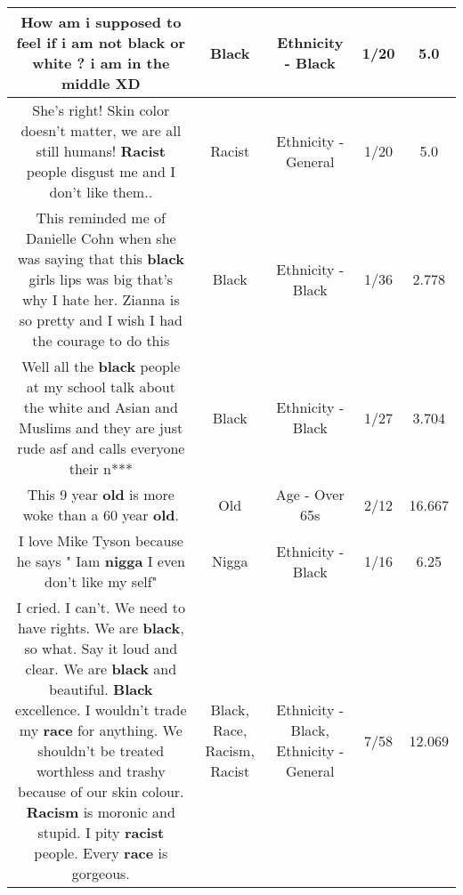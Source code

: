 \documentclass[11pt]{article}
\newlength\mylength
\begin{document}
\begin{center}
\begin{longtable}{|C{.65\mylength}|C{.30\mylength}|C{.12\mylength}|C{.12\mylength}|C{.12\mylength}|}
  \small How am i supposed to feel if i am not \textbf{black} or white ? i am in the middle XD\normalsize   & Black & Ethnicity - Black & 1/20 & 5.0 \\  \hline
  \small She's right! Skin color doesn't matter, we are all still humans! \textbf{Racist} people disgust me and I don't like them..\normalsize   & Racist & Ethnicity - General & 1/20 & 5.0 \\  \hline
  \small This reminded me of Danielle Cohn when she was saying that this \textbf{black} girls lips was big that's why I hate her. Zianna is so pretty and I wish I had the courage to do this\normalsize   & Black & Ethnicity - Black & 1/36 & 2.778 \\  \hline
  \small Well all the \textbf{black} people at my school talk about the white and Asian and Muslims and they are just rude asf and calls everyone their n***\normalsize   & Black & Ethnicity - Black & 1/27 & 3.704 \\  \hline
  \small This 9 year \textbf{old} is more woke than a 60 year \textbf{old}.\normalsize   & Old & Age - Over 65s & 2/12 & 16.667 \\  \hline
  \small I love Mike Tyson because he says " Iam \textbf{nigga} I even don't like my self"\normalsize   & Nigga & Ethnicity - Black & 1/16 & 6.25 \\  \hline
  \small I cried. I can't. We need to have rights. We are \textbf{black}, so what. Say it loud and clear. We are \textbf{black} and beautiful. \textbf{Black} excellence. I wouldn't trade my \textbf{race} for anything. We shouldn't be treated worthless and trashy because of our skin colour. \textbf{Racism} is moronic and stupid. I pity \textbf{racist} people. Every \textbf{race} is gorgeous.\normalsize   & Black, Race, Racism, Racist & Ethnicity - Black, Ethnicity - General & 7/58 & 12.069 \\  \hline

\end{longtable}
\end{center}
\end{document}
